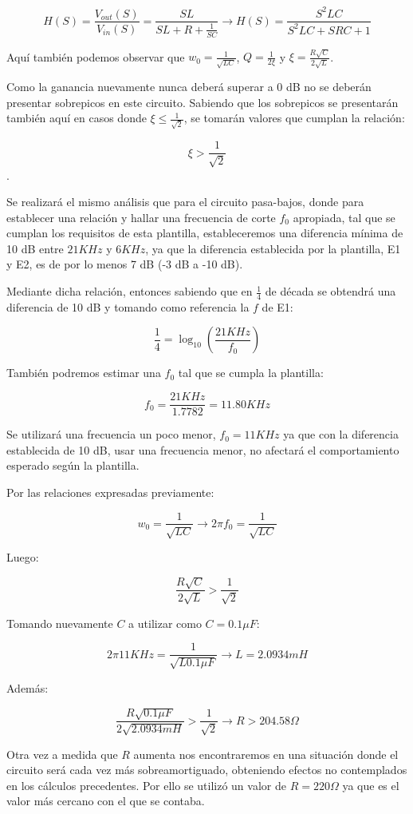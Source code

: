 $$H(S)=\frac{V_{out}(S)}{V_{in}(S)}=\frac{SL}{SL+R+\frac{1}{SC}} \longrightarrow H(S)=\frac{S^{2}LC}{S^2LC+SRC+1}$$

Aquí también podemos observar que $w_0=\frac{1}{\sqrt{LC}}$, $Q=\frac{1}{2\xi}$ y $\xi=\frac{R\sqrt{C}}{2\sqrt{L}}$.

Como la ganancia nuevamente nunca deberá superar a 0 dB no se deberán presentar sobrepicos en este circuito.
Sabiendo que los sobrepicos se presentarán también aquí en casos donde $\xi \leq \frac{1}{\sqrt{2}}$, se tomarán valores que cumplan la relación:

$$\xi > \frac{1}{\sqrt{2}}$$.

Se realizará el mismo análisis que para el circuito pasa-bajos, donde para establecer una relación y hallar una frecuencia de corte $f_0$ apropiada, tal que se cumplan los requisitos
de esta plantilla, estableceremos una diferencia mínima de 10 dB entre $21 KHz$ y $6 KHz$, ya que la diferencia establecida por la plantilla, E1 y E2,
es de por lo menos 7 dB (-3 dB a -10 dB).

Mediante dicha relación, entonces sabiendo que en $\frac{1}{4}$ de década se obtendrá una diferencia de 10 dB y tomando como referencia 
la $f$ de E1:

$$\frac{1}{4}=\log_{10}(\frac{21KHz}{f_0})$$

También podremos estimar una $f_0$ tal que se cumpla la plantilla:

$$f_0 = \frac{21KHz}{1.7782} = 11.80 KHz$$

Se utilizará una frecuencia un poco menor, $f_0=11 KHz$ ya que con la diferencia establecida de 10 dB, usar una frecuencia menor, no afectará el comportamiento 
esperado según la plantilla.

Por las relaciones expresadas previamente:

$$w_0=\frac{1}{\sqrt{LC}} \longrightarrow 2\pi f_0=\frac{1}{\sqrt{LC}}$$

Luego:

$$\frac{R\sqrt{C}}{2\sqrt{L}} > \frac{1}{\sqrt{2}}$$

Tomando nuevamente $C$ a utilizar como $C=0.1\mu F$: 

$$2\pi 11KHz=\frac{1}{\sqrt{L0.1 \mu F}} \longrightarrow L = 2.0934 mH$$

Además:

$$\frac{R\sqrt{0.1\mu F}}{2\sqrt{2.0934mH}} > \frac{1}{\sqrt{2}} \longrightarrow R > 204.58 \Omega $$

Otra vez a medida que $R$ aumenta nos encontraremos en una situación donde el circuito será
cada vez más sobreamortiguado, obteniendo efectos no contemplados en los cálculos precedentes. 
Por ello se utilizó un valor de $R= 220 \Omega$ ya que es el valor más cercano con el que se contaba.

